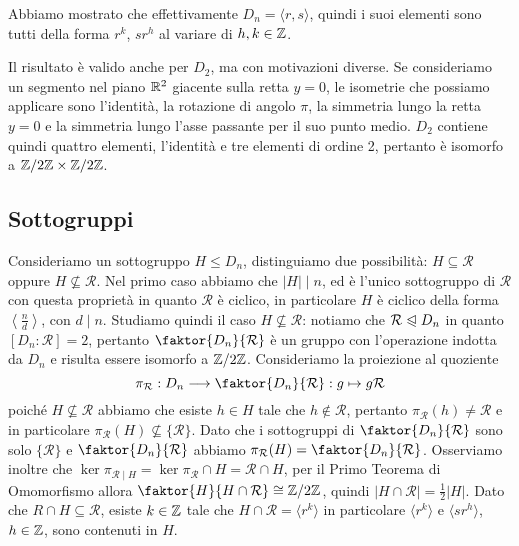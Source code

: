 \documentclass[11pt]{scrartcl}
\begin{document}
\begin{remark}
    Abbiamo mostrato che effettivamente $D_n = \langle r, s\rangle$, quindi i
    suoi elementi sono tutti della forma $r^k$, $sr^h$ al variare di $h, k \in \mathbb Z$. 
\end{remark}

\begin{remark}
    Il risultato è valido anche per $D_2$, ma con motivazioni diverse. 
    Se consideriamo un segmento nel piano $\mathbb R^2$ giacente sulla retta $y = 0$, 
    le isometrie che possiamo applicare sono l'identità, la rotazione di 
    angolo $\pi$, la simmetria lungo la retta $y = 0$ e la simmetria lungo l'asse
    passante per il suo punto medio. $D_2$ contiene quindi quattro elementi,
    l'identità e tre elementi di ordine 2, pertanto è isomorfo a $\mathbb{Z}/{2}\mathbb{Z}\times\mathbb{Z}/{2}\mathbb{Z}$.
\end{remark}


\subsection{Sottogruppi}

Consideriamo un sottogruppo $H\leqslant D_n$, distinguiamo due possibilità: 
$H \subseteq \mathcal{R}$ oppure $H \nsubseteq \mathcal{R}$. Nel primo caso
abbiamo che $|H|\mid n$, ed è l'unico sottogruppo di $\mathcal{R}$ con questa 
proprietà in quanto $\mathcal{R}$ è ciclico, in particolare $H$ è ciclico 
della forma $ \displaystyle\left<\frac n d\right>$, con $d \mid n$. \newline
Studiamo quindi il caso $H \nsubseteq \mathcal{R}$: notiamo che 
$\mathcal{R}\trianglelefteqslant D_n$ in quanto $[D_n : \mathcal{R}] = 2$,
pertanto $\faktor{D_n}{\mathcal{R}}$ è un gruppo con l'operazione indotta da $D_n$
e risulta essere isomorfo a $\mathbb{Z}/{2}\mathbb{Z}$. \newline
Consideriamo la proiezione al quoziente \[
    \pi_{\mathcal{R}}: D_n \longrightarrow \faktor{D_n}{\mathcal{R}} : g \mapsto g\mathcal{R}
\]poiché $H \nsubseteq \mathcal{R}$ abbiamo che esiste $h \in H$ tale che 
$h \notin \mathcal{R}$, pertanto $\pi_{\mathcal{R}}(h) \neq \mathcal{R}$ e
in particolare $\pi_{\mathcal{R}}(H) \nsubseteq \{\mathcal{R}\}$. Dato che i 
sottogruppi di $\faktor{D_n}{\mathcal{R}}$ sono solo $\{\mathcal{R}\}$ e
$\faktor{D_n}{\mathcal{R}}$ abbiamo $\pi_{\mathcal{R}}(H) = 
\faktor{D_n}{\mathcal{R}}$. Osserviamo inoltre che $\ker \pi_{\mathcal{R}\mid H} = 
\ker \pi_{\mathcal{R}} \cap H = \mathcal{R}\cap H$, per il Primo Teorema di Omomorfismo
allora $\faktor{H}{H\cap \mathcal{R}} \cong \Z2$, quindi 
$|H\cap\mathcal{R}| = \displaystyle\frac 1 2 |H|$. Dato che $R\cap H \subseteq
\mathcal{R}$, esiste $k \in \mathbb Z$ tale che $H\cap\mathcal{R} = \langle r^k\rangle$
in particolare $\langle r^k\rangle$ e $\langle sr^h\rangle$, $h \in \mathbb Z$, sono
contenuti in $H$. 
\end{document}
